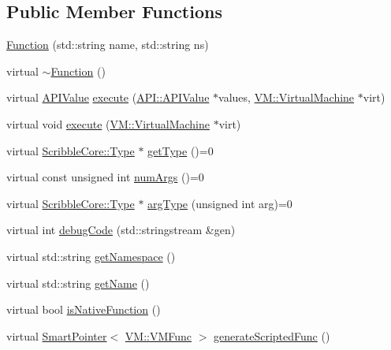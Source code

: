 \subsection*{Public Member Functions}
\begin{DoxyCompactItemize}
\item 
\hyperlink{class_a_p_i_1_1_function_a1e90ad6e08814d4035864f490d72feeb}{Function} (std\-::string name, std\-::string ns)
\item 
virtual \hyperlink{class_a_p_i_1_1_function_ad5db4630dd3517764272b171e1531443}{$\sim$\-Function} ()
\item 
virtual \hyperlink{class_a_p_i_1_1_a_p_i_value}{A\-P\-I\-Value} \hyperlink{class_a_p_i_1_1_function_ac3bc5de6ce095a4c8474525ef181c4af}{execute} (\hyperlink{class_a_p_i_1_1_a_p_i_value}{A\-P\-I\-::\-A\-P\-I\-Value} $\ast$values, \hyperlink{class_v_m_1_1_virtual_machine}{V\-M\-::\-Virtual\-Machine} $\ast$virt)
\item 
virtual void \hyperlink{class_a_p_i_1_1_function_a5acc2022cdbd5fe47c1a04769a1d8cf4}{execute} (\hyperlink{class_v_m_1_1_virtual_machine}{V\-M\-::\-Virtual\-Machine} $\ast$virt)
\item 
virtual \hyperlink{class_scribble_core_1_1_type}{Scribble\-Core\-::\-Type} $\ast$ \hyperlink{class_a_p_i_1_1_function_a85b0b2ee88d3ac61a0e77f94e06445b1}{get\-Type} ()=0
\item 
virtual const unsigned int \hyperlink{class_a_p_i_1_1_function_ae56761ad4c849c05e12cb4cd02583c77}{num\-Args} ()=0
\item 
virtual \hyperlink{class_scribble_core_1_1_type}{Scribble\-Core\-::\-Type} $\ast$ \hyperlink{class_a_p_i_1_1_function_a531806ea8476e8aa396eb98ce81e713b}{arg\-Type} (unsigned int arg)=0
\item 
virtual int \hyperlink{class_a_p_i_1_1_function_a1d90140ae782b05a9ffd63ffb96d8909}{debug\-Code} (std\-::stringstream \&gen)
\item 
virtual std\-::string \hyperlink{class_a_p_i_1_1_function_a5e873f1585e43b8b94fb94632875b586}{get\-Namespace} ()
\item 
virtual std\-::string \hyperlink{class_a_p_i_1_1_function_a201d120f73276bcc59bd2590195a5f4e}{get\-Name} ()
\item 
virtual bool \hyperlink{class_a_p_i_1_1_function_a450fc79d97dd8393bf94aead888592c3}{is\-Native\-Function} ()
\item 
virtual \hyperlink{_smart_pointer_8hpp_afdd8d4ba81c3fcbdeacf1dafba2accfb}{Smart\-Pointer}$<$ \hyperlink{class_v_m_1_1_v_m_func}{V\-M\-::\-V\-M\-Func} $>$ \hyperlink{class_a_p_i_1_1_function_a133061933b79944d3c2adb08c8d50a71}{generate\-Scripted\-Func} ()
\end{DoxyCompactItemize}
